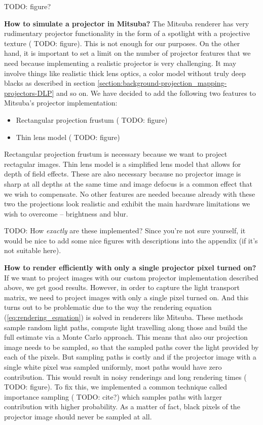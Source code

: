 {\color{red} TODO: figure?}

\textbf{How to simulate a projector in Mitsuba?} The Mitsuba renderer has very rudimentary projector functionality in the form of a spotlight with a projective texture ({\color{red} TODO: figure}). This is not enough for our purposes. On the other hand, it is important to set a limit on the number of projector features that we need because implementing a realistic projector is very challenging. It may involve things like realistic thick lens optics, a color model without truly deep blacks as described in section \ref{section:background-projection_mapping-projectors-DLP} and so on. We have decided to add the following two features to Mitsuba's projector implementation:

\begin{itemize}
    \item Rectangular projection frustum ({\color{red} TODO: figure})
    \item Thin lens model ({\color{red} TODO: figure})
\end{itemize}

Rectangular projection frustum is necessary because we want to project rectagular images. Thin lens model is a simplified lens model that allows for depth of field effects. These are also necessary because no projector image is sharp at all depths at the same time and image defocus is a common effect that we wish to compensate. No other features are needed because already with these two the projections look realistic and exhibit the main hardware limitations we wish to overcome -- brightness and blur.

{\color{red} TODO: How \textit{exactly} are these implemented? Since you're not sure yourself, it would be nice to add some nice figures with descriptions into the appendix (if it's not suitable here).}

\textbf{How to render efficiently with only a single projector pixel turned on?} If we want to project images with our custom projector implementation described above, we get good results. However, in order to capture the light transport matrix, we need to project images with only a single pixel turned on. And this turns out to be problematic due to the way the rendering equation (\ref{eq:rendering_equation}) is solved in renderers like Mitsuba. These methods sample random light paths, compute light travelling along those and build the full estimate via a Monte Carlo approach. This means that also our projection image needs to be sampled, so that the sampled paths cover the light provided by each of the pixels. But sampling paths is costly and if the projector image with a single white pixel was sampled uniformly, most paths would have zero contribution. This would result in noisy renderings and long rendering times ({\color{red} TODO: figure}). To fix this, we implemented a common technique called importance sampling ({\color{red} TODO: cite?}) which samples paths with larger contribution with higher probability. As a matter of fact, black pixels of the projector image should never be sampled at all.

